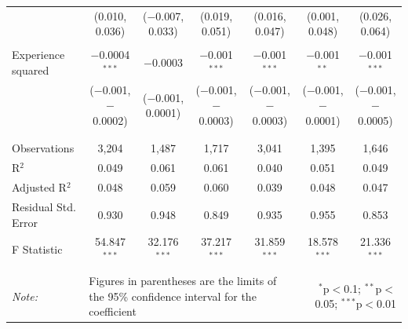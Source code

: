 \documentclass[alpha-refs]{wiley-article-01g}
\begin{document}
\begin{landscape}
\begin{table}[!htbp]
\begin{tabular}{@{\extracolsep{5pt}}lcccccc}
  & (0.010, 0.036) & ($-$0.007, 0.033) & (0.019, 0.051) & (0.016, 0.047) & (0.001, 0.048) & (0.026, 0.064) \\ 
  & & & & & & \\ 
 Experience squared & $-$0.0004$^{***}$ & $-$0.0003 & $-$0.001$^{***}$ & $-$0.001$^{***}$ & $-$0.001$^{**}$ & $-$0.001$^{***}$ \\ 
  & ($-$0.001, $-$0.0002) & ($-$0.001, 0.0001) & ($-$0.001, $-$0.0003) & ($-$0.001, $-$0.0003) & ($-$0.001, $-$0.0001) & ($-$0.001, $-$0.0005) \\ 
  & & & & & & \\ 
\hline \\[-3ex] 
Observations & 3,204 & 1,487 & 1,717 & 3,041 & 1,395 & 1,646 \\ 
R$^{2}$ & 0.049 & 0.061 & 0.061 & 0.040 & 0.051 & 0.049 \\ 
Adjusted R$^{2}$ & 0.048 & 0.059 & 0.060 & 0.039 & 0.048 & 0.047 \\ 
Residual Std. Error & 0.930 & 0.948 & 0.849 & 0.935 & 0.955 & 0.853 \\ 
F Statistic & 54.847$^{***}$ & 32.176$^{***}$ & 37.217$^{***}$ & 31.859$^{***}$ & 18.578$^{***}$ & 21.336$^{***}$ \\ 
\hline 
\hline \\[-3ex] 
\textit{Note:} &\multicolumn{4}{l}{Figures in parentheses are the limits of the 95\% confidence interval for the coefficient}  & \multicolumn{2}{r}{$^{*}$p$<$0.1; $^{**}$p$<$0.05; $^{***}$p$<$0.01} \\ 
\end{tabular} 
\end{table} 

\end{landscape}

\newpage
\end{document}
